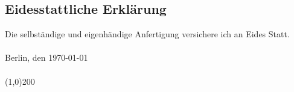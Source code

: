 
\thispagestyle{empty}
\vspace{.3\textheight}
\begin{center}
\section*{Eidesstattliche Erkl\"{a}rung}
\end{center}
\vfill
Die selbst\"{a}ndige und eigenh\"{a}ndige Anfertigung versichere ich an Eides Statt.\\
\vspace{10pt}\\
Berlin, den \today{}\\
\vspace{10pt}\\
\line(1,0){200}
\clearpage




